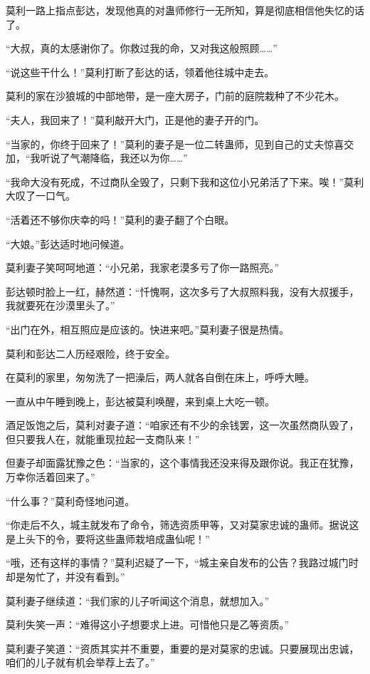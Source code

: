 \begin{this_body}
莫利一路上指点彭达，发现他真的对蛊师修行一无所知，算是彻底相信他失忆的话了。

“大叔，真的太感谢你了。你救过我的命，又对我这般照顾……”

“说这些干什么！”莫利打断了彭达的话，领着他往城中走去。

莫利的家在沙狼城的中部地带，是一座大房子，门前的庭院栽种了不少花木。

“夫人，我回来了！”莫利敲开大门，正是他的妻子开的门。

“当家的，你终于回来了！”莫利的妻子是一位二转蛊师，见到自己的丈夫惊喜交加，“我听说了气潮降临，我还以为你……”

“我命大没有死成，不过商队全毁了，只剩下我和这位小兄弟活了下来。唉！”莫利大叹了一口气。

“活着还不够你庆幸的吗！”莫利的妻子翻了个白眼。

“大娘。”彭达适时地问候道。

莫利妻子笑呵呵地道：“小兄弟，我家老漠多亏了你一路照亮。”

彭达顿时脸上一红，赫然道：“忏愧啊，这次多亏了大叔照料我，没有大叔援手，我就要死在沙漠里头了。”

“出门在外，相互照应是应该的。快进来吧。”莫利妻子很是热情。

莫利和彭达二人历经艰险，终于安全。

在莫利的家里，匆匆洗了一把澡后，两人就各自倒在床上，呼呼大睡。

一直从中午睡到晚上，彭达被莫利唤醒，来到桌上大吃一顿。

酒足饭饱之后，莫利对妻子道：“咱家还有不少的余钱罢，这一次虽然商队毁了，但只要我人在，就能重现拉起一支商队来！”

但妻子却面露犹豫之色：“当家的，这个事情我还没来得及跟你说。我正在犹豫，万幸你活着回来了。”

“什么事？”莫利奇怪地问道。

“你走后不久，城主就发布了命令，筛选资质甲等，又对莫家忠诚的蛊师。据说这是上头下的令，要将这些蛊师栽培成蛊仙呢！”

“哦，还有这样的事情？”莫利迟疑了一下，“城主亲自发布的公告？我路过城门时却是匆忙了，并没有看到。”

莫利妻子继续道：“我们家的儿子听闻这个消息，就想加入。”

莫利失笑一声：“难得这小子想要求上进。可惜他只是乙等资质。”

莫利妻子笑道：“资质其实并不重要，重要的是对莫家的忠诚。只要展现出忠诚，咱们的儿子就有机会举荐上去了。”


\end{this_body}
